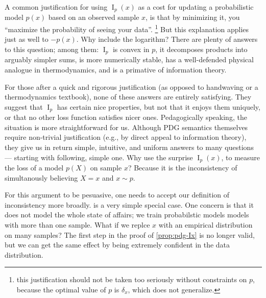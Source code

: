 \documentclass[twoside]{article}
\theoremstyle{plain}
\theoremstyle{definition}
\DeclareMathOperator{\I}{\mathrm{I}} %
\begin{document}
A common justification for using $\I_p(x)$ as a cost for updating a probabilistic model $p(x)$ based on an observed sample $x$, is that by minimizing it, you  ``maximize the probability of seeing your data''.%
%
 	\footnote{this justification should not be taken too seriously  without constraints on $p$, because the optimal value of $p$  is $\delta_x$, which does not generalize.}
But this explanation applies just as well to $-p(x)$. Why include the logarithm?
There are plenty of answers to this question; among them: $\I_p$ is convex in $p$, it decomposes products into arguably simpler sums, is more numerically stable, has a well-defended physical analogue in thermodynamics, and is a primative of information theory.

For those after a quick and rigorous justification (as opposed to handwaving or a thermodynamics textbook), none of these answers are entirely satisfying.
They suggest that $\I_p$ has certain nice properties, but not that it enjoys them uniquely, or that no other loss function satisfies nicer ones.
Pedagogically speaking, the situation is more straightforward for us.
Although PDG semantics themselves require non-trivial justification (e.g., by direct appeal to information theory), they give us in return simple, intuitive, and uniform answers to many questions --- starting with following, simple one.
Why use the surprise $\I_p(x)$, to measure the loss of a model $p(X)$ on sample $x$? Because it is the inconsistency of simultanously believing $X = x$ and $x \sim p$.

For this argument to be pesuasive, one needs to accept our definition of inconsistency more broadly.  is a very simple special case.
One concern is that it does not model the whole state of affairs; we train probabilstic models models with more than one sample.
What if we replce $x$ with an empirical distribution on many samples?
The first step in the proof of \cref{prop:pdg-Ix} is no longer valid, but we can get the same effect by being extremely confident in the data distribution.
\end{document}
